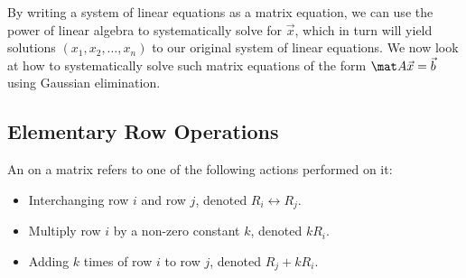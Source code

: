 By writing a system of linear equations as a matrix equation, we can use the power of linear algebra to systematically solve for $\vec x$, which in turn will yield solutions $(x_1, x_2, \dots, x_n)$ to our original system of linear equations. We now look at how to systematically solve such matrix equations of the form $\mat A \vec x = \vec b$ using Gaussian elimination.

\subsection{Elementary Row Operations}

\begin{definition}
    An  on a matrix refers to one of the following actions performed on it:
    \begin{itemize}
        \item Interchanging row $i$ and row $j$, denoted $R_i \leftrightarrow R_j$.
        \item Multiply row $i$ by a non-zero constant $k$, denoted $k R_i$.
        \item Adding $k$ times of row $i$ to row $j$, denoted $R_j + k R_i$.
    \end{itemize}
\end{definition}

